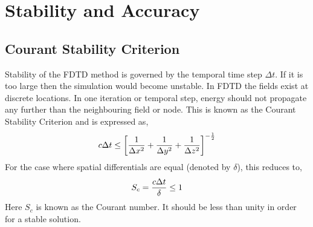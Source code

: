 \section{Stability and Accuracy}
\subsection{Courant Stability Criterion}
Stability of the FDTD method is governed by the temporal time step $\Delta t$. If it is too large then the simulation would become unstable. In FDTD the fields exist at discrete locations. In one iteration or temporal step, energy should not propagate any further than the neighbouring field or node. This is known as the Courant Stability Criterion and is expressed as,
\begin{equation}
\centering
c \Delta t \leq \left[ \dfrac{1}{\Delta x^2} + \dfrac{1}{\Delta y^2} + \dfrac{1}{\Delta z^2} \right]^{-\frac{1}{2}}
\label{Courant-Stability-Criterion}
\end{equation}
For the case where spatial differentials are equal (denoted by $\delta$), this reduces to,
\begin{equation}
\centering
S_c = \dfrac{c \Delta t}{\delta} \leq 1
\label{Courant-Stability-Criterion-Equal-Differentials}
\end{equation}
Here $S_c$ is known as the Courant number. It should be less than unity in order for a stable solution.
